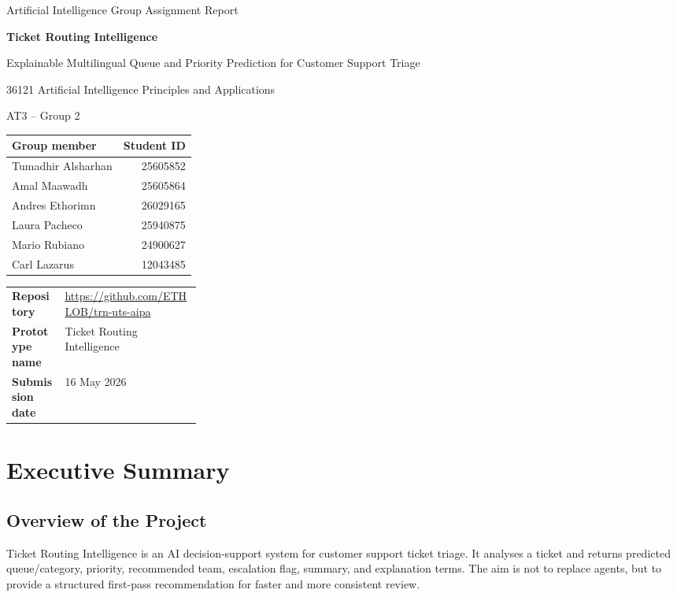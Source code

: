 \documentclass[11pt,a4paper]{article}
\begin{document}
\begin{titlepage}
\centering
\vspace*{1.5cm}
{\Large Artificial Intelligence Group Assignment Report\par}
\vspace{1.3cm}
{\huge\bfseries Ticket Routing Intelligence\par}
\vspace{0.35cm}
{\large Explainable Multilingual Queue and Priority Prediction for Customer Support Triage\par}
\vspace{1.1cm}
{\large 36121 Artificial Intelligence Principles and Applications\par}
\vspace{0.35cm}
{\large AT3 -- Group 2\par}
\vspace{1cm}
\begin{tabularx}{0.82\linewidth}{Y r}
\toprule
\textbf{Group member} & \textbf{Student ID}\\
\midrule
Tumadhir Alsharhan & 25605852\\
Amal Maawadh & 25605864\\
Andres Ethorimn & 26029165\\
Laura Pacheco & 25940875\\
Mario Rubiano & 24900627\\
Carl Lazarus & 12043485\\
\bottomrule
\end{tabularx}
\vfill
\begin{tabularx}{0.82\linewidth}{>{\bfseries}p{0.28\linewidth} Y}
\toprule
Repository & \url{https://github.com/ETHLOB/trn-uts-aipa}\\
Prototype name & Ticket Routing Intelligence\\
Submission date & 16 May 2026\\
\bottomrule
\end{tabularx}
\vspace*{1cm}
\end{titlepage}

\section{Executive Summary}
\subsection{Overview of the Project}
Ticket Routing Intelligence is an AI decision-support system for customer support ticket triage. It analyses a ticket and returns predicted queue/category, priority, recommended team, escalation flag, summary, and explanation terms. The aim is not to replace agents, but to provide a structured first-pass recommendation for faster and more consistent review.
\end{document}
